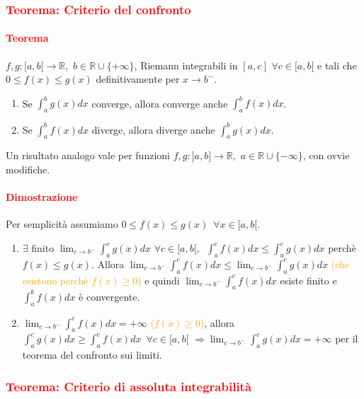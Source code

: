 \documentclass{article}
\newcommand{\R}{\mathbb{R}}
\begin{document}
\subsubsection{\textcolor{red}{Teorema: Criterio del confronto}}
\paragraph{\textcolor{red}{Teorema}}
$f,g:[a,b[\rightarrow\R, \,\, b\in\R\cup\{+\infty\}$, Riemann integrabili in $[a,c] \,\, \forall c \in [a,b[$ e tali che $0\leq f(x) \leq g(x)$ definitivamente per $x \rightarrow b^-$.
\begin{enumerate}
    \item Se $\int_{a}^{b}g(x)dx$ converge, allora converge anche $\int_{a}^{b} f(x)dx$.
    \item Se $\int_{a}^{b} f(x)dx$ diverge, allora diverge anche $\int_{a}^{b}g(x)dx$.
\end{enumerate}
Un risultato analogo vale per funzioni $f,g:]a,b]\rightarrow\R, \,\, a\in\R\cup\{-\infty\}$, con ovvie modifiche.

\paragraph{\textcolor{red}{Dimostrazione}}
Per semplicità assumiamo $0 \leq f(x)\leq g(x) \,\,\, \forall x \in [a,b[$.
\begin{enumerate}
    \item $\exists$ finito $\lim_{c \rightarrow b^-} \int_{a}^{c} g(x) dx \,\, \forall c \in [a,b[,\,\,\, \int_{a}^{c}f(x)dx \leq \int_{a}^{c} g(x)dx$ perchè $f(x)\leq g(x)$. Allora $\lim_{c \rightarrow b^-} \int_{a}^{c} f(x)dx \leq \lim_{c \rightarrow b^-} \int_{a}^{c} g(x)dx$ \textcolor{orange}{(che esistono perchè $f(x)\geq 0$)} e quindi $\lim_{c \rightarrow b^-} \int_{a}^{c} f(x)dx $ esiste finito e $\int_{a}^{b} f(x)dx$ è convergente.
    \item $\lim_{c \rightarrow b^-} \int_{a}^{c} f(x) dx = +\infty $ \textcolor{orange}{($f(x)\geq 0$)}, allora $\int_{a}^{c} g(x)dx \geq \int_{a}^{c} f(x) dx \,\,\, \forall c \in [a,b[$ $\Rightarrow \lim_{c \rightarrow b^-} \int_{a}^{c} g(x)dx =+\infty$ per il teorema del confronto sui limiti.
\end{enumerate}
\begin{flushright}
\large\Lightning
\end{flushright}

\subsubsection{\textcolor{red}{Teorema: Criterio di assoluta integrabilità}}
\end{document}
